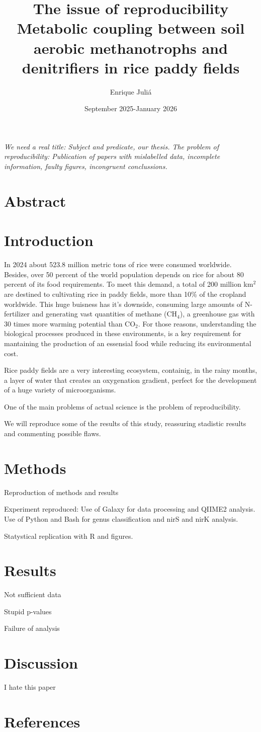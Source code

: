 \documentclass{article}
\title{The issue of reproducibility\\
  \large Metabolic coupling between soil aerobic methanotrophs and denitrifiers in rice paddy fields}
\author{Enrique Juliá}
\date{September 2025-January 2026}
\begin{document}
\maketitle

\textit{We need a real title: Subject and predicate, our thesis. The problem of reproducibility: Publication of papers with mislabelled data, incomplete information, faulty figures, incongruent conclussions.}

\section{Abstract}

\section{Introduction}

In 2024 about 523.8 million metric tons of rice were consumed worldwide. Besides, over 50 percent of the world population depends on rice for about 80 percent of its food requirements. To meet this demand, a total of 200 million km$^2$ are destined to cultivating rice in paddy fields, more than 10\% of the cropland worldwide.
This huge buisness has it's downside, consuming large amounts of N-fertilizer and generating vast quantities of methane (CH$_4$), a greenhouse gas with 30 times more warming potential than CO$_2$. For those reasons, understanding the biological processes produced in these environments, is a key requirement for mantaining the production of an essensial food while reducing its environmental cost.

Rice paddy fields are a very interesting ecosystem, containig, in the rainy months, a layer of water that creates an oxygenation gradient, perfect for the development of a huge variety of microorganisms.

One of the main problems of actual science is the problem of reproducibility.

We will reproduce some of the results of this study, reassuring stadistic results and commenting possible flaws.

\section{Methods}

Reproduction of methods and results

Experiment reproduced: Use of Galaxy for data processing and QIIME2 analysis. Use of Python and Bash for genus classification and nirS and nirK analysis.

Statystical replication with R and figures.

\section{Results}

Not sufficient data

Stupid p-values

Failure of analysis

\section{Discussion}

I hate this paper

\section{References}
\end{document}
